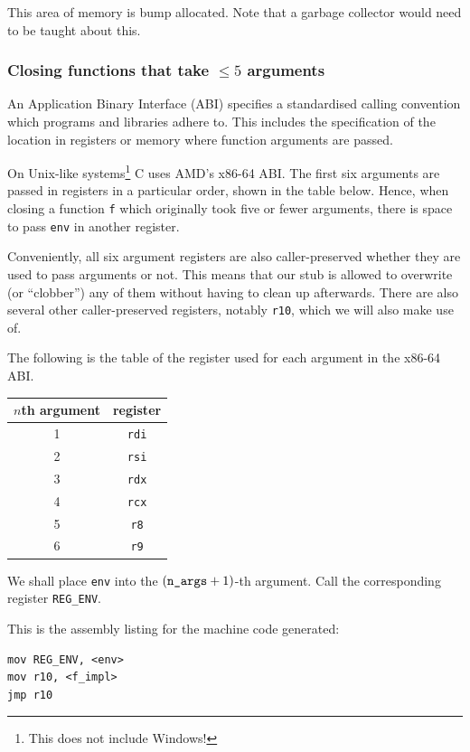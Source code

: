 \documentclass[12pt,a4paper,twoside,openright]{report}
\begin{document}
This area of memory is bump allocated. Note that a garbage collector would need
to be taught about this.

\subsubsection{Closing functions that take $\le 5$ arguments}

An Application Binary Interface (ABI) specifies a standardised calling
convention which programs and libraries adhere to. This includes the
specification of the location in registers or memory where function arguments
are passed.

On Unix-like systems\footnote{This does not include Windows!} C uses AMD's x86-64
ABI. The first six arguments are passed in registers in a particular order,
shown in the table below. Hence, when closing a function \lstinline!f! which
originally took five or fewer arguments, there is space to pass \lstinline!env!
in another register.

Conveniently, all six argument registers are also caller-preserved whether they
are used to pass arguments or not. This means that our stub is allowed to
overwrite (or ``clobber'') any of them without having to clean up afterwards.
There are also several other caller-preserved registers, notably
\lstinline!r10!, which we will also make use of.

The following is the table of the register used for each argument in the x86-64
ABI.

\begin{tabular}{ c | c }
  $n$th argument & register \\
  \hline
  1 & \lstinline!rdi! \\
  2 & \lstinline!rsi! \\
  3 & \lstinline!rdx! \\
  4 & \lstinline!rcx! \\
  5 & \lstinline!r8! \\
  6 & \lstinline!r9!
\end{tabular}

We shall place \lstinline!env! into the $(\text{\texttt{n\char`_args}}+1)$-th
argument. Call the corresponding register \lstinline!REG_ENV!.

This is the assembly listing for the machine code generated:

\begin{lstlisting}
mov REG_ENV, <env>
mov r10, <f_impl>
jmp r10
\end{lstlisting}
\end{document}
